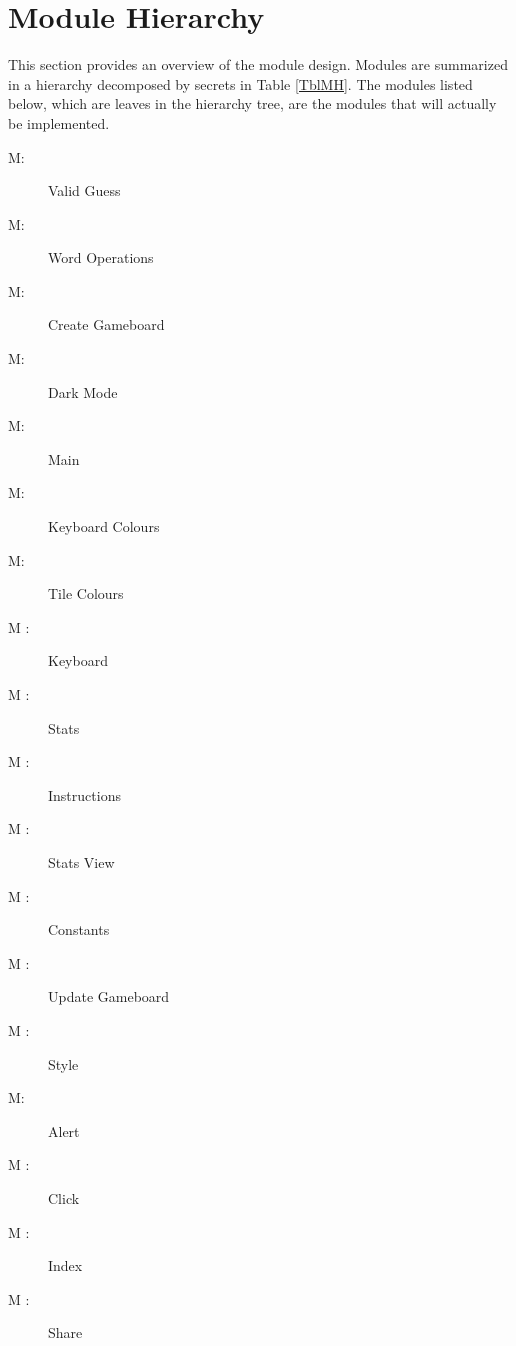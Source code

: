 \documentclass[12pt, titlepage]{article}
\newcounter{mnum}
\newcommand{\mthemnum}{M\themnum}
\begin{document}
	\section{Module Hierarchy} \label{SecMH}
	
	This section provides an overview of the module design. Modules are summarized
	in a hierarchy decomposed by secrets in Table \ref{TblMH}. The modules listed
	below, which are leaves in the hierarchy tree, are the modules that will
	actually be implemented.
	
	\begin{description}
		\item [ \mthemnum \label{m1}:]
		Valid Guess
		\item [ \mthemnum \label{m2}:]
		Word Operations
		\item [ \mthemnum \label{m3}:]
		Create Gameboard
		\item [ \mthemnum \label{m4}:]
		Dark Mode
		\item [ \mthemnum \label{m5}:]
		Main
		\item [ \mthemnum \label{m6}:]
		Keyboard Colours
		\item [ \mthemnum \label{m7}:]
		Tile Colours
		\item [ \mthemnum
		\label{m8}:]
		Keyboard
		\item [ \mthemnum
		\label{m9}:]
		Stats
		\item [ \mthemnum
		\label{m10}:]
		Instructions
		\item [ \mthemnum
		\label{m11}:]
		Stats View
		\item [ \mthemnum
		\label{m12}:]
		Constants
		\item [ \mthemnum
		\label{m13}:]
		Update Gameboard
		\item [ \mthemnum
		\label{m14}:]
		Style
		\item [ \mthemnum \label{m15}:]
		Alert
		\item [ \mthemnum
		\label{m16}:]
		Click
		\item [ \mthemnum
		\label{m17}:]
		Index
		\item [ \mthemnum
		\label{m18}:]
		Share
		
		
		
	\end{description}
	
\end{document}
